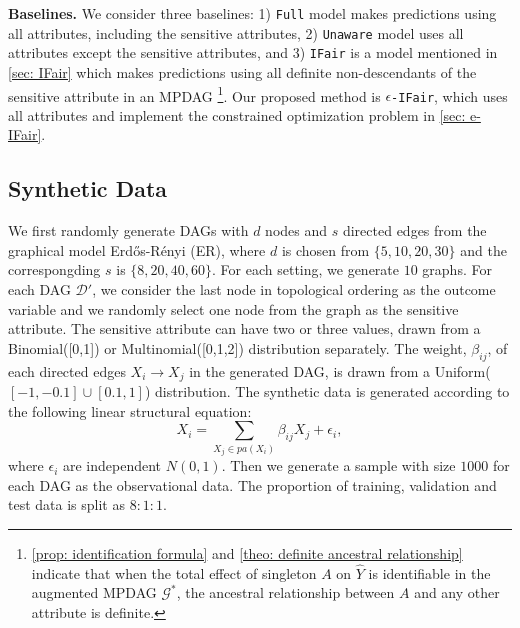 \documentclass{article} %
\begin{document}
\textbf{Baselines.} We consider three baselines: 1) \texttt{Full} model makes predictions using all attributes, including the sensitive attributes, 2) \texttt{Unaware} model uses all attributes except the sensitive attributes, and 3) \texttt{IFair} is a model mentioned in \cref{sec: IFair} which makes predictions using all definite non-descendants of the sensitive attribute in an MPDAG
\footnote{\cref{prop: identification formula} and \cref{theo: definite ancestral relationship} indicate that when the total effect of singleton $A$ on $\hat{Y}$ is identifiable in the augmented MPDAG $\mathcal{G^*}$, the ancestral relationship between $A$ and any other attribute is definite.}.
Our proposed method is \texttt{$\epsilon$-IFair}, which uses all attributes and implement the constrained optimization problem in \cref{sec: e-IFair}. 

\subsection{Synthetic Data} \label{sec: Experiment/Synthetic Data}

We first randomly generate DAGs with $d$ nodes and $s$ directed edges from the graphical model Erd{\H{o}}s-R{\'e}nyi (ER), where $d$ is chosen from $\{5,10,20,30\}$ and the correspongding $s$ is $\{8,20,40,60\}$. For each setting, we generate $10$ graphs. For each DAG $\mathcal{D'}$, we consider the last node in topological ordering as the outcome variable and we randomly select one node from the graph as the sensitive attribute. The sensitive attribute can have two or three values, drawn from a Binomial([0,1]) or Multinomial([0,1,2]) distribution separately. The weight, $\beta_{ij}$, of each directed edges $X_i \rightarrow X_j$ in the generated DAG, is drawn from a Uniform($[-1,-0.1]\cup [0.1,1]$) distribution. The synthetic data is generated according to the following linear structural equation:
\begin{equation} \label{eq: linear structual equation model}
    X_i = \sum_{X_j \in pa(X_i)} \beta_{ij}X_j + \epsilon_i, %
\end{equation}
where %
$\epsilon_i$ are independent $N(0,1)$. Then we generate a sample with size $1000$ for each DAG as the observational data. The proportion of training, validation and test data is split as $8:1:1$. 
\end{document}
